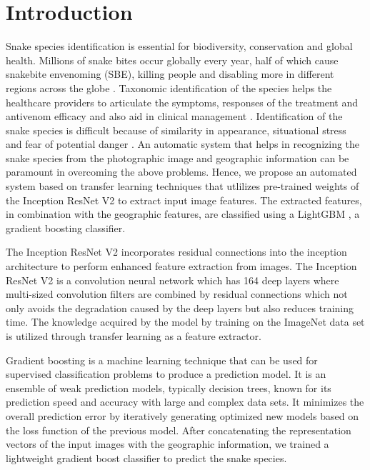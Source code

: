 \documentclass[
]{ceurart}
\begin{document}
\maketitle

\section{Introduction}

Snake species identification is essential for biodiversity, conservation and global health. Millions of snake bites occur globally every year, half of which cause snakebite envenoming (SBE), killing people and disabling  more in different regions across the globe \cite{jm}.  Taxonomic identification of the species helps the healthcare providers to articulate the symptoms, responses of the treatment  and antivenom efficacy and also aid in clinical management \cite{yang, garg}. Identification of the snake species is difficult because of similarity in appearance, situational stress and fear of potential danger \cite{stephen}. An automatic system that helps in recognizing the snake species from the photographic image and geographic information can be paramount in overcoming the above problems. Hence, we propose an automated system based on transfer learning techniques that utlilizes pre-trained weights of the Inception ResNet V2 \cite{Szegedy_IncResnet} to extract input image features. The extracted features, in combination with the geographic features, are classified using a LightGBM \cite{guolin}, a gradient boosting classifier. 

The Inception ResNet V2 incorporates residual connections into the inception architecture to perform enhanced feature extraction from images. The Inception ResNet V2 is a convolution neural network which has 164 deep layers where multi-sized convolution filters are combined by residual connections which not only avoids the degradation caused by the deep layers but also reduces training time. The knowledge acquired by the model by training on the ImageNet data set \cite{imagenet_dataset} is utilized through transfer learning as a feature extractor. 

Gradient boosting \cite{friedman} is a machine learning technique that can be used for supervised classification problems to produce a prediction model. It is an ensemble of weak prediction models, typically decision trees, known for its prediction speed and accuracy with large and complex data sets. It minimizes the overall prediction error by iteratively generating optimized new models based on the loss function of the previous model. After concatenating the representation vectors of the input images with the geographic information, we trained a lightweight gradient boost classifier to predict the snake species.
\end{document}

